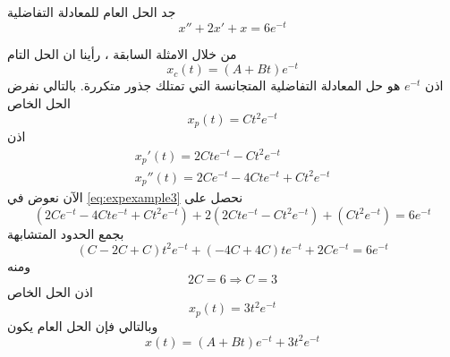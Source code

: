 \begin{example}
	جد الحل العام للمعادلة التفاضلية
	\begin{equation}
		\label{eq:expexample3}
		x'' + 2x' + x = 6e^{-t}
	\end{equation}
\end{example}
\begin{solution}
	من خلال الامثلة السابقة ، رأينا ان الحل التام
	\[
	x_c(t) = (A + Bt) e^{-t}
	\]
	اذن $e^{-t}$ هو حل المعادلة التفاضلية المتجانسة التي تمتلك جذور متكررة. بالتالي نفرض الحل الخاص
	\[
	x_p(t) = C t^2 e^{-t}
	\]
	اذن
	\begin{gather*}
		x_p'(t) = 2C te^{-t} - Ct^2 e^{-t}\\
		x_p''(t) = 2C e^{-t} - 4C t e^{-t} + C t^2 e^{-t}
	\end{gather*}
	الآن نعوض في \eqref{eq:expexample3} نحصل على 
	\[
	(2C e^{-t} - 4C t e^{-t} + C t^2 e^{-t}) + 2(2C te^{-t} - Ct^2 e^{-t}) + (C t^2 e^{-t}) = 6 e^{-t}
	\]
	بجمع الحدود المتشابهة
	\[
	(C-2C+C)t^2 e^{-t} + (-4C + 4C)te^{-t} + 2C e^{-t}  = 6 e^{-t}
	\]
	ومنه
	\[
	2C = 6 \Rightarrow C= 3
	\]
	اذن الحل الخاص
	\[
	x_p(t) = 3t^2 e^{-t}
	\]
	وبالتالي فإن الحل العام يكون
	\[
	x(t) =  (A + Bt) e^{-t} + 3t^2 e^{-t}
	\]
\end{solution}
